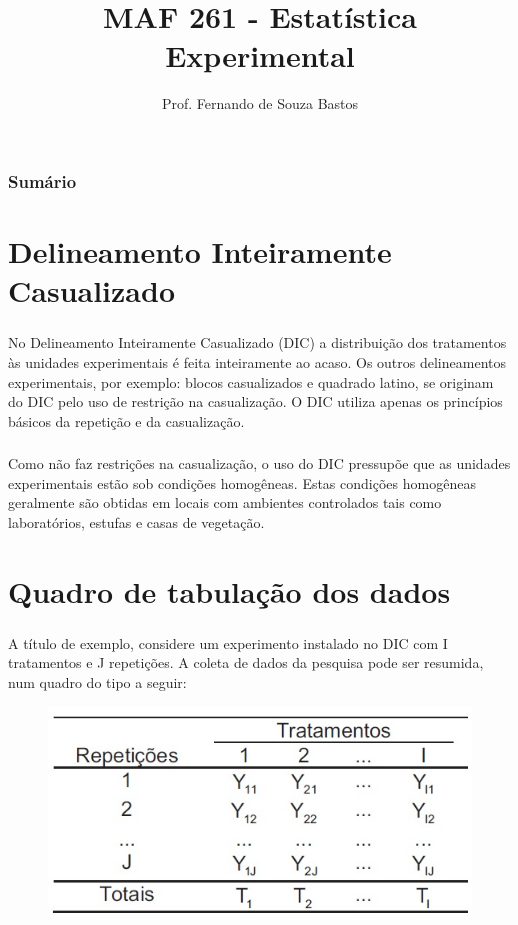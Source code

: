 \documentclass[14pt,aspectratio=1610]{beamer}
\title{MAF 261 - Estatística Experimental}
\author{Prof. Fernando de Souza Bastos}
\institute{Instituto de Ciências Exatas e Tecnológicas\texorpdfstring{\\ Universidade Federal de Viçosa}{}\texorpdfstring{\\ Campus UFV - Florestal}{}}
\date[\today]{}
\begin{document}


\frame{\titlepage}

\begin{frame}{}
\frametitle{\bf Sumário}
\tableofcontents
\end{frame}

\section{Delineamento Inteiramente Casualizado}
\begin{frame}{}
\frametitle{}
\begin{block}{}
\justifying
No Delineamento Inteiramente Casualizado (DIC) a distribuição dos tratamentos às
unidades experimentais é feita inteiramente ao acaso. Os outros delineamentos
experimentais, por exemplo: blocos casualizados e quadrado latino, se originam do DIC
pelo uso de restrição na casualização. O DIC utiliza apenas os princípios básicos da
repetição e da casualização.
\end{block}
\end{frame}

\begin{frame}{}
\frametitle{}
\begin{block}{}
\justifying
Como não faz restrições na casualização, o uso do DIC pressupõe que as
unidades experimentais estão sob condições homogêneas. Estas condições homogêneas
geralmente são obtidas em locais com ambientes controlados tais como laboratórios,
estufas e casas de vegetação.
\end{block}
\end{frame}

\section{Quadro de tabulação dos dados}
\begin{frame}{}
\frametitle{}
\begin{block}{}
\justifying
A título de exemplo, considere um experimento instalado no DIC com I tratamentos
e J repetições. A coleta de dados da pesquisa pode ser resumida, num quadro do tipo a
seguir:
\begin{figure}[H]
    \centering
    \includegraphics[scale=0.5]{Figuras/fig1}
  \end{figure}
\end{block}
\end{frame}
\end{document}
